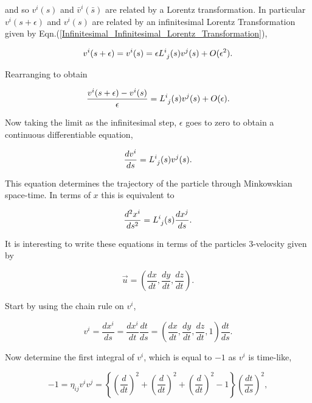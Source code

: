 \noindent and so $v^i(s)$ and $\bar{v}^i(\bar{s})$ are related by a Lorentz transformation. In particular $v^i(s+\epsilon)$ and $v^i(s)$ are related by an infinitesimal Lorentz Transformation given by Eqn.(\ref{Infinitesimal_Infinitesimal_Lorentz_Transformation}),

\begin{equation}
v^i(s+\epsilon) = v^i(s) = \epsilon \tensor{L}{^{i}_{j}}(s)v^j (s) + O(\epsilon^2).
\end{equation}

\noindent Rearranging to obtain

\begin{equation}
\frac{v^i(s+\epsilon) - v^i(s)}{\epsilon} = \tensor{L}{^{i}_{j}}(s)v^j (s) + O(\epsilon).
\end{equation}

\noindent Now taking the limit as the infinitesimal step, $\epsilon$ goes to zero to obtain a continuous differentiable equation,

\begin{equation}\label{Infinitesimal_DE_interms_v}
\frac{dv^i}{ds} = \tensor{L}{^{i}_{j}}(s) v^j (s).
\end{equation}

\noindent This equation determines the trajectory of the particle through Minkowskian space-time. In terms of $x$ this is equivalent to

\begin{equation*}
\frac{d^2 x^i}{ds^2} = \tensor{L}{^{i}_{j}}(s) \frac{d x^j}{ds}.
\end{equation*}

It is interesting to write these equations in terms of the particles $3$-velocity given by

\begin{equation*}
\vec{u} = \left( \frac{dx}{dt}, \frac{dy}{dt}, \frac{dz}{dt} \right).
\end{equation*}

\noindent Start by using the chain rule on $v^i$,

\begin{equation*}\label{Infinitesimal_Chain_Rule}
v^i = \frac{dx^i}{ds} = \frac{dx^i}{dt} \frac{dt}{ds} = \left(\frac{dx}{dt},\frac{dy}{dt},\frac{dz}{dt},1\right) \frac{dt}{ds}.
\end{equation*}

\noindent Now determine the first integral of $v^i$, which is equal to $-1$ as $v^i$ is time-like,

\begin{equation*} 
-1 = \eta_{ij} v^i v^j =  \left\{ \left( \frac{d}{dt} \right)^2  + \left( \frac{d}{dt} \right)^2  + \left( \frac{d}{dt} \right)^2 - 1  \right\} \left( \frac{dt}{ds} \right)^2,
\end{equation*} 

